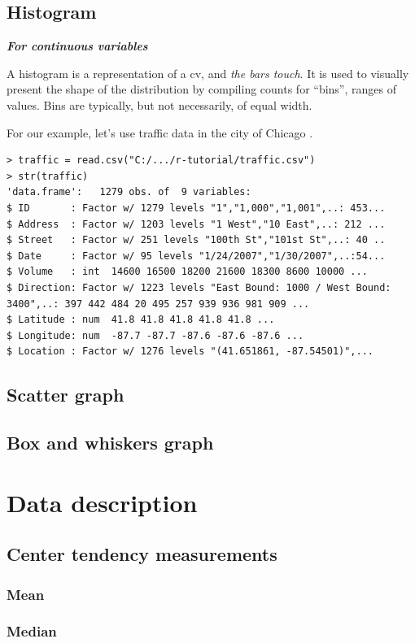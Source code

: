 \documentclass{report}
\newcommand{\notefor}[1]{\hfill\textbf{\textit{#1}}}
\begin{document}
	\section{Histogram}
	\notefor{For continuous variables}
	
	A histogram is a representation of a \gls{cv}, and \emph{the bars touch}. It is used to visually present the shape of the distribution by compiling counts for ``bins'', ranges of values. Bins are typically, but not necessarily, of equal width.
	
	For our example, let's use traffic data in the city of Chicago \cite{traffic}. 
	
	\begin{verbatim}
> traffic = read.csv("C:/.../r-tutorial/traffic.csv")
> str(traffic)
'data.frame':   1279 obs. of  9 variables:
$ ID       : Factor w/ 1279 levels "1","1,000","1,001",..: 453...
$ Address  : Factor w/ 1203 levels "1 West","10 East",..: 212 ...
$ Street   : Factor w/ 251 levels "100th St","101st St",..: 40 ..
$ Date     : Factor w/ 95 levels "1/24/2007","1/30/2007",..:54...
$ Volume   : int  14600 16500 18200 21600 18300 8600 10000 ...
$ Direction: Factor w/ 1223 levels "East Bound: 1000 / West Bound: 3400",..: 397 442 484 20 495 257 939 936 981 909 ...
$ Latitude : num  41.8 41.8 41.8 41.8 41.8 ...
$ Longitude: num  -87.7 -87.7 -87.6 -87.6 -87.6 ...
$ Location : Factor w/ 1276 levels "(41.651861, -87.54501)",...
	\end{verbatim}
	
	
	\section{Scatter graph}
	\section{Box and whiskers graph}
	
\chapter{Data description}
	\section{Center tendency measurements}
		\subsection{Mean}
		\subsection{Median}
\end{document}
